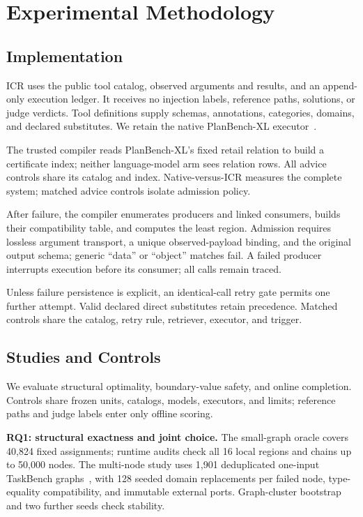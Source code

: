 \section{Experimental Methodology}
\subsection{Implementation}
ICR uses the public tool catalog, observed arguments and results, and an
append-only execution ledger. It receives no injection labels, reference
paths, solutions, or judge verdicts. Tool definitions supply schemas,
annotations, categories, domains, and declared substitutes. We retain the
native PlanBench-XL executor~\cite{planbenchxl}.

The trusted compiler reads PlanBench-XL's fixed retail relation to build a
certificate index; neither language-model arm sees relation rows. All advice
controls share its catalog and index. Native-versus-ICR measures the complete
system; matched advice controls isolate admission policy.

After failure, the compiler enumerates producers and linked consumers, builds
their compatibility table, and computes the least region. Admission requires
lossless argument transport, a unique observed-payload binding, and the
original output schema; generic ``data'' or ``object'' matches fail. A failed
producer interrupts execution before its consumer; all calls remain traced.

Unless failure persistence is explicit, an identical-call retry gate permits
one further attempt. Valid declared direct substitutes retain precedence.
Matched controls share the catalog, retry rule, retriever, executor, and trigger.

\subsection{Studies and Controls}
We evaluate structural optimality, boundary-value safety, and online completion.
Controls share frozen units, catalogs, models, executors, and limits; reference
paths and judge labels enter only offline scoring.

\textbf{RQ1: structural exactness and joint choice.}
The small-graph oracle covers 40,824 fixed assignments; runtime audits check
all 16 local regions and chains up to 50,000 nodes. The multi-node study uses
1,901 deduplicated one-input TaskBench graphs~\cite{taskbench}, with 128 seeded
domain replacements per failed node, type-equality compatibility, and immutable
external ports. Graph-cluster bootstrap and two further seeds check stability.


